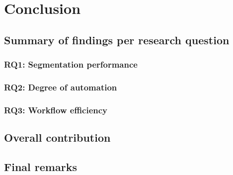 \chapter{Conclusion}
\section{Summary of findings per research question}
\subsection{RQ1: Segmentation performance}
\subsection{RQ2: Degree of automation}
\subsection{RQ3: Workflow efficiency}
\section{Overall contribution}
\section{Final remarks}